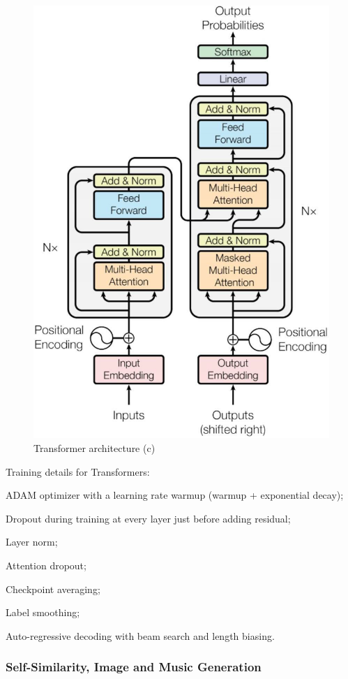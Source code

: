 \begin{minipage}{.4\linewidth}
    \begin{figure}[H]
        \centering
        \includegraphics[width=0.7\linewidth]{images/seq-transformer-8}
        \caption[Transformer architecture (c)]{Transformer architecture (c)}
        \label{fig:seq-transformer-8}
    \end{figure}
\end{minipage}

Training details for Transformers:
\begin{myitem}
    \item ADAM optimizer with a learning rate warmup (warmup + exponential decay);
    \item Dropout during training at every layer just before adding residual;
    \item Layer norm;
    \item Attention dropout;
    \item Checkpoint averaging;
    \item Label smoothing;
    \item Auto-regressive decoding with beam search and length biasing.
\end{myitem}


\subsubsection{Self-Similarity, Image and Music Generation}\label{sec:seq-self-similarity}

